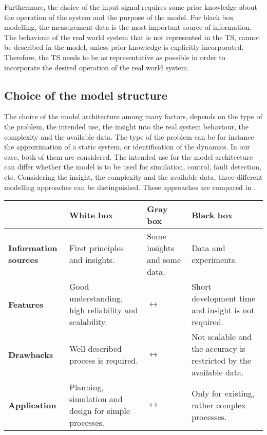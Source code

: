 Furthermore, the choice of the input signal requires some prior knowledge about the operation of the system and the purpose of the model. For black box modelling, the measurement data is the most important source of information. The behaviour of the real world system that is not represented in the TS, cannot be described in the model, unless prior knowledge is explicitly incorporated. Therefore, the TS needs to be as representative as possible in order to incorporate the desired operation of the real world system. 
\vspace{-3mm}
\subsection{Choice of the model structure}
\label{choice_of_the_model_architecture}

The choice of the model architecture among many factors, depends on the type of the problem, the intended use, the insight into the real system behaviour, the complexity and the available data. The type of the problem can be for instance the approximation of a static system, or identification of the dynamics. In our case, both of them are considered. The intended use for the model architecture can differ whether the model is to be used for simulation, control, fault detection, etc. Considering the insight, the complexity and the available data, three different modelling approaches can be distinguished\cite{nelles2013nonlinear}. These approaches are compared in . 

\vspace{-3mm}

\begin{center}
    \begin{tabular}{ | >{\centering\arraybackslash}m{1.8cm} | >{\centering\arraybackslash}m{3.6cm} | >{\centering\arraybackslash}m{3.6cm} | >{\centering\arraybackslash}m{3.6cm} |}
    \hline
    \multirow{1}{*}
     & \textbf{White box} & \textbf{Gray box} & \textbf{Black box} \\ 
     \hline
     \multirow{1}{*}
    \textbf{Information sources} & First principles and insights. &  Some insights and some data. & Data and experiments.\\ 
    \hline
      \multirow{1}{*}
    \textbf{Features} & Good understanding, high reliability and scalability. & $\longleftrightarrow$  & Short development time and insight is not required.\\ 
    \hline
      \multirow{1}{*}
    \textbf{Drawbacks} & Well described process is required. & $\longleftrightarrow$ & Not scalable and the accuracy is restricted by the available data.\\ 
    \hline
          \multirow{1}{*}
    \textbf{Application} & Planning, simulation and design for simple processes. & $\longleftrightarrow$ & Only for existing, rather complex processes.\\ 
    \hline
    \end{tabular}
    \label{comparisontable_sysid}
\end{center}

